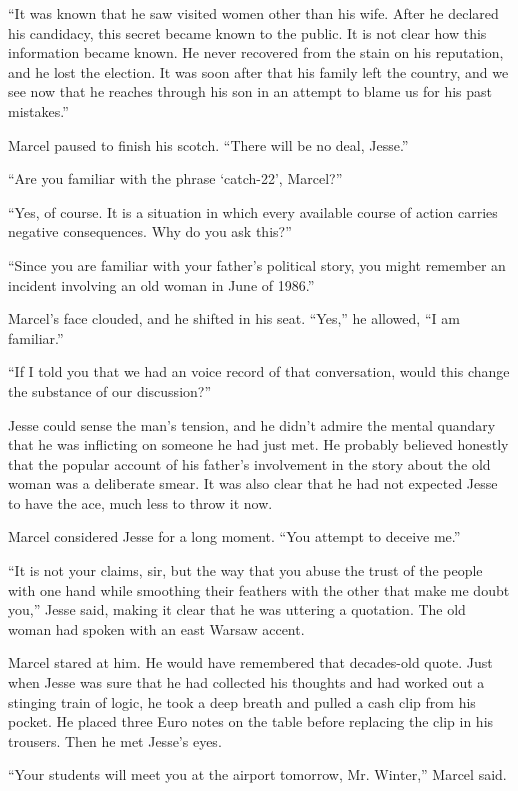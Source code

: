 \documentclass[12pt]{book}
\begin{document}
``It was known that he saw visited women other than his wife.  After he declared his candidacy, this secret became known to the public.  It is not clear how this information became known.  He never recovered from the stain on his reputation, and he lost the election.  It was soon after that his family left the country, and we see now that he reaches through his son in an attempt to blame us for his past mistakes.''

Marcel paused to finish his scotch.  ``There will be no deal, Jesse.''

``Are you familiar with the phrase `catch-22', Marcel?''

``Yes, of course.  It is a situation in which every available course of action carries negative consequences.  Why do you ask this?''

``Since you are familiar with your father's political story, you might remember an incident involving an old woman in June of 1986.''

Marcel's face clouded, and he shifted in his seat.  ``Yes,'' he allowed, ``I am familiar.''

``If I told you that we had an voice record of that conversation, would this change the substance of our discussion?''

Jesse could sense the man's tension, and he didn't admire the mental quandary that he was inflicting on someone he had just met.  He probably believed honestly that the popular account of his father's involvement in the story about the old woman was a deliberate smear.  It was also clear that he had not expected Jesse to have the ace, much less to throw it now.

Marcel considered Jesse for a long moment.  ``You attempt to deceive me.''

``It is not your claims, sir, but the way that you abuse the trust of the people with one hand while smoothing their feathers with the other that make me doubt you,'' Jesse said, making it clear that he was uttering a quotation.  The old woman had spoken with an east Warsaw accent.

Marcel stared at him.  He would have remembered that decades-old quote.  Just when Jesse was sure that he had collected his thoughts and had worked out a stinging train of logic, he took a deep breath and pulled a cash clip from his pocket.  He placed three Euro notes on the table before replacing the clip in his trousers.  Then he met Jesse's eyes.

``Your students will meet you at the airport tomorrow, Mr. Winter,'' Marcel said.
\end{document}

